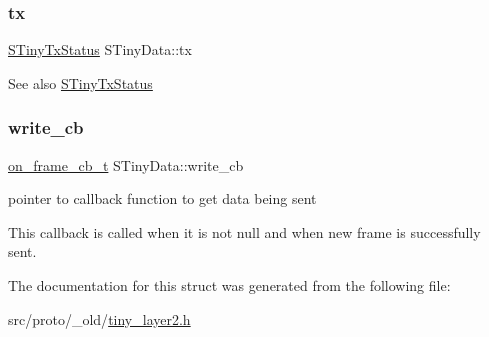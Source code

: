 \subsubsection{\texorpdfstring{tx}{tx}}
{\footnotesize\ttfamily \hyperlink{structSTinyTxStatus}{S\+Tiny\+Tx\+Status} S\+Tiny\+Data\+::tx}

\begin{DoxySeeAlso}{See also}
\hyperlink{structSTinyTxStatus}{S\+Tiny\+Tx\+Status} 
\end{DoxySeeAlso}
\mbox{\label{structSTinyData_ada334c88e86bfd2c10191f65818c3fb3}} 
\subsubsection{\texorpdfstring{write\+\_\+cb}{write\_cb}}
{\footnotesize\ttfamily \hyperlink{tiny__types_8h_ad6bf709565b8aecb9e6ecf196f219d54}{on\+\_\+frame\+\_\+cb\+\_\+t} S\+Tiny\+Data\+::write\+\_\+cb}



pointer to callback function to get data being sent 

This callback is called when it is not null and when new frame is successfully sent. 

The documentation for this struct was generated from the following file\+:\begin{DoxyCompactItemize}
\item 
src/proto/\+\_\+old/\hyperlink{tiny__layer2_8h}{tiny\+\_\+layer2.\+h}\end{DoxyCompactItemize}
